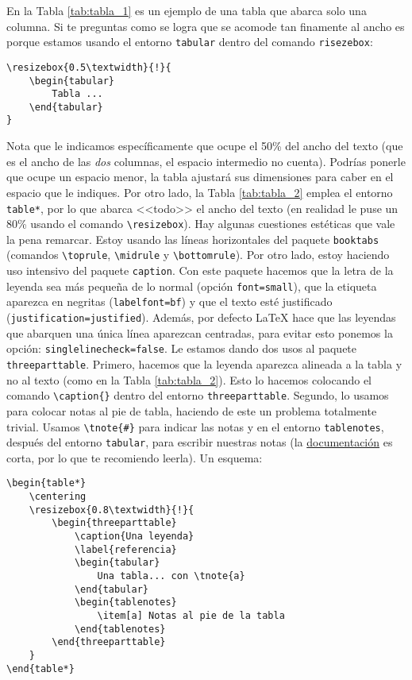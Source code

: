 \documentclass[a4paper,10pt,twocolumn,twoside]{article}
\begin{document}
En la Tabla \ref{tab:tabla_1} es un ejemplo de una tabla que abarca solo una columna. Si te preguntas como se logra que se acomode tan finamente al ancho es porque estamos usando el entorno \texttt{tabular} dentro del comando \texttt{risezebox}:
\begin{Verbatim}[fontsize=\fontsize{7pt}{7pt}\selectfont]
\resizebox{0.5\textwidth}{!}{
    \begin{tabular}
        Tabla ...
    \end{tabular}
}
\end{Verbatim}
Nota que le indicamos específicamente que ocupe el 50\% del ancho del texto (que es el ancho de las \emph{dos} columnas, el espacio intermedio no cuenta). Podrías ponerle que ocupe un espacio menor, la tabla ajustará sus dimensiones para caber en el espacio que le indiques. Por otro lado, la Tabla \ref{tab:tabla_2} emplea el entorno \texttt{table*}, por lo que abarca <<todo>> el ancho del texto (en realidad le puse un 80\% usando el comando \verb+\resizebox+). Hay algunas cuestiones estéticas que vale la pena remarcar. Estoy usando las líneas horizontales del paquete \texttt{booktabs} (comandos \verb+\toprule+, \verb+\midrule+ y \verb+\bottomrule+). Por otro lado, estoy haciendo uso intensivo del paquete \texttt{caption}. Con este paquete hacemos que la letra de la leyenda sea más pequeña de lo normal (opción \texttt{font=small}), que la etiqueta aparezca en negritas (\texttt{labelfont=bf}) y que el texto esté justificado (\texttt{justification=justified}). Además, por defecto \LaTeX{} hace que las leyendas que abarquen una única línea aparezcan centradas, para evitar esto ponemos la opción: \texttt{singlelinecheck=false}. Le estamos dando dos usos al paquete \texttt{threeparttable}. Primero, hacemos que la leyenda aparezca alineada a la tabla y no al texto (como en la Tabla \ref{tab:tabla_2}). Esto lo hacemos colocando el comando \verb+\caption{}+ dentro del entorno \texttt{threeparttable}. Segundo, lo usamos para colocar notas al pie de tabla, haciendo de este un problema totalmente trivial. Usamos \verb+\tnote{#}+ para indicar las notas y en el entorno \texttt{tablenotes}, después del entorno \texttt{tabular}, para escribir nuestras notas (la \href{https://ctan.dcc.uchile.cl/macros/latex/contrib/threeparttable/threeparttable.pdf}{documentación} es corta, por lo que te recomiendo leerla). Un esquema:
\begin{Verbatim}[fontsize=\fontsize{7pt}{7pt}\selectfont]
\begin{table*}
    \centering
    \resizebox{0.8\textwidth}{!}{
        \begin{threeparttable}
            \caption{Una leyenda}
            \label{referencia}
            \begin{tabular}
                Una tabla... con \tnote{a}
            \end{tabular}
            \begin{tablenotes}
                \item[a] Notas al pie de la tabla
            \end{tablenotes}
        \end{threeparttable}
    }
\end{table*}
\end{Verbatim}
\end{document}
